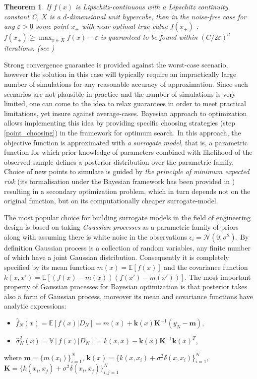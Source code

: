 \documentclass[a4paper]{jpconf}
\theoremstyle{my_theorem_style}
\newtheorem{theorem}{Theorem}
\numberwithin{equation}{section}
\begin{document}
\begin{theorem}
If $f(x)$ is Lipschitz-continuous with a Lipschitz continuity constant C, $X$ is a $d$-dimensional unit hypercube, then in the noise-free case for any $\varepsilon  > 0$ some point $x_+$ with near-optimal true value $f(x_+)$ : $f(x_+) \geq \max_{x \in X}f(x) - \varepsilon $ is guaranteed to be found within $(C/2\varepsilon)^d$ iterations. (see \cite{Betro1991})
\end{theorem}

Strong convergence guarantee is provided against the worst-case
scenario, however the solution in this case will typically require an
impractically large number of simulations for any reasonable accuracy
of approximation. Since such scenarios are not plausible in practice
and the number of simulations is very limited, one can come to the
idea to relax guarantees in order to meet practical limitations, yet insure against average-cases. 
Bayesian approach to optimization allows implementing this idea by providing specific choosing strategies (step \ref{point_choosing}) in the framework for optimum search. In this approach, the objective function is approximated with \emph{a surrogate model}, that is, a parametric function for which prior knowledge of parameters combined with likelihood of the observed sample defines a posterior distribution over the parametric family. Choice of new points to simulate is guided by \emph{the principle of minimum expected risk} (its formalisation under the Bayesian framework has been provided in \cite{Burnaev2015}) resulting in a secondary optimization problem, which in turn depends not on the original function, but on its computationally cheaper surrogate-model.

The most popular choice for building surrogate models in the field of engineering design is based on taking \emph{Gaussian processes} as a parametric family of priors along with assuming there is white noise in the observations $\epsilon_i = \mathcal{N}(0, \sigma^2)$. By definition \cite{rasmussen2006gaussian,Burnaev2016} Gaussian process is a collection of random variables, any finite number of which have a joint Gaussian distribution. Consequently it is completely specified by its mean function $m(x) = \mathbb{E}[f(x)]$ and the covariance function $k(x, x') = \mathbb{E}[(f(x) - m(x))(f(x') - m(x'))]$. The most important property of Gaussian processes for Bayesian optimization is that posterior takes also a form of Gaussian process, moreover its mean and covariance functions have analytic expressions:
\begin{itemize}
\item $\hat{f}_N(x) = \mathbb{E}[f(x)|D_N] = m(x) + \mathbf{k}(x)\mathbf{K}^{-1} (y_N - \mathbf{m})$,
\item $\hat{\sigma}_N^2(x) = \mathbb{V}[f(x)|D_N] = k(x, x) - \mathbf{k}(x)\mathbf{K}^{-1}\mathbf{k}(x)^T$,
\end{itemize}
where $\mathbf{m} = \{m(x_i)\}_{i=1}^N$, $\mathbf{k}(x) = \{k(x, x_i) + \sigma^2 \delta(x, x_i)\}_{i=1}^N$, $\mathbf{K} = \{k(x_i, x_j) + \sigma^2 \delta(x_i, x_j)\}_{i,j=1}^N$
\end{document}
